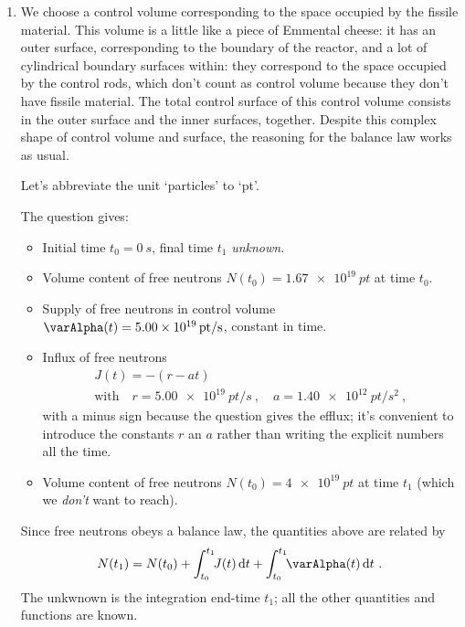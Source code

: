 \documentclass[a4paper,12pt,%
onecolumn,oneside,%
british%
]{memoir}
\newcommand*{\di}{\mathrm{d}}%
\renewcommand*{\|}[1][]{\nonscript\:#1\vert\nonscript\:\mathopen{}}
\newcommand*{\yti}{t_{0}}
\newcommand*{\ytf}{t_{1}}
\newcommand*{\yN}{N}
\newcommand*{\yJ}{J}
\newcommand*{\ya}{\varAlpha}
\begin{document}
\begin{enumerate}[exerc]
\item  We choose a control volume corresponding to the space occupied by the fissile material. This volume is a little like a piece of Emmental cheese: it has an outer surface, corresponding to the boundary of the reactor, and a lot of  cylindrical boundary surfaces within: they correspond to the space occupied by the control rods, which don't count as control volume because they don't have fissile material. The total control surface of this control volume consists in the outer surface and the inner surfaces, together. Despite this complex shape of control volume and surface, the reasoning for the balance law works as usual.

  Let's abbreviate the unit \enquote*{particles} to \enquote*{pt}.

  The question gives:
  \begin{itemize}[nosep]
  \item Initial time $\yti=\qty{0}{s}$, final time $\ytf$ \emph{unknown}.
  \item Volume content of free neutrons $\yN(\yti)=\qty{1.67e19}{pt}$ at time $\yti$.
  \item Supply of free neutrons in control volume $\ya(t) = \qty{5.00e19}{pt/s}$, constant in time.
  \item Influx of free neutrons
    \begin{equation*}
      \begin{gathered}
     \yJ(t) = -(r - a t)
     \\
     \text{with}\quad
     r= \qty{5.00e19}{pt/s} \ ,\quad
     a = \qty{1.40e12}{pt/s^{2}} \ ,
      \end{gathered}
    \end{equation*}
with a minus sign because the question gives the efflux; it's convenient to introduce the constants $r$ an $a$ rather than writing the explicit numbers all the time.
\item   Volume content of free neutrons $\yN(\yti)=\qty{4e19}{pt}$ at time $\ytf$ (which we \emph{don't} want to reach).
  \end{itemize}

  Since free neutrons obeys a balance law, the quantities above are related by
  \begin{equation*}
    \yN(\ytf) = \yN(\yti) + \int_{\yti}^{\ytf}\!\!\yJ(t)\, \di t
    + \int_{\yti}^{\ytf}\!\!\ya(t)\, \di t \ .
  \end{equation*}
  The unkwnown is the integration end-time $\ytf$; all the other quantities and functions are known.


\end{enumerate}
\end{document}
